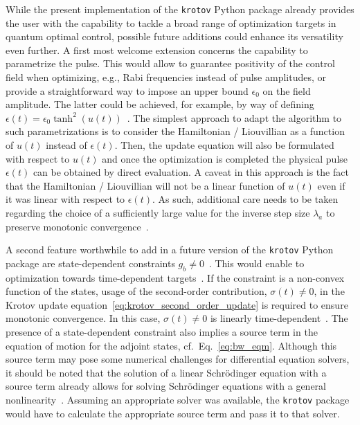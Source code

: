 \documentclass[submission, Phys]{SciPost}
\begin{document}
While the present implementation of the \texttt{krotov} Python package already
provides the user with the capability to tackle a broad range of optimization
targets in quantum optimal control, possible future additions could enhance its
versatility even further.
A first most welcome extension concerns the capability to parametrize the pulse.
This would allow to guarantee positivity of the control field when optimizing,
e.g., Rabi frequencies instead of pulse amplitudes, or provide a straightforward
way to impose an upper bound $\epsilon_0$ on the field amplitude.
The latter could be achieved, for example, by way of defining
$\epsilon(t)=\epsilon_0 \tanh^2\left(u(t)\right)$~\cite{MuellerPRA2011}.
The simplest approach to adapt the algorithm to such parametrizations is to
consider the Hamiltonian / Liouvillian as a function of $u(t)$ instead of
$\epsilon(t)$.
Then, the update equation will also be formulated with respect to $u(t)$ and
once the optimization is completed the physical pulse $\epsilon(t)$ can be
obtained by direct evaluation.
A caveat in this approach is the fact that the Hamiltonian / Liouvillian will
not be a linear function of $u(t)$ even if it was linear with respect to
$\epsilon(t)$.
As such, additional care needs to be taken regarding the choice of a
sufficiently large value for the inverse step size $\lambda_a$ to preserve
monotonic convergence~\cite{ReichJCP12}.

A second feature worthwhile to add in a future version of the \texttt{krotov}
Python package are state-dependent constraints
$g_b\neq0$~\cite{ReichJCP12,PalaoPRA2008}.
This would enable to optimization towards time-dependent
targets~\cite{KaiserJCP2004, SerbanPRA2005}.
If the constraint is a non-convex function of the states, usage of the
second-order contribution, $\sigma(t)\neq 0$, in the Krotov update
equation~\eqref{eq:krotov_second_order_update} is required to ensure monotonic
convergence.
In this case, $\sigma(t)\neq 0$ is linearly time-dependent~\cite{ReichJCP12}.
The presence of a state-dependent constraint also implies a source term in the
equation of motion for the adjoint states, cf.~Eq.~\eqref{eq:bw_eqm}.
Although this source term may pose some numerical challenges for differential
equation solvers, it should be noted that the solution of a linear Schrödinger
equation with a source term already allows for solving Schrödinger equations
with a general nonlinearity~\cite{SchaeferJCompP2017}.
Assuming an appropriate solver was available, the \texttt{krotov} package would
have to calculate the appropriate source term and pass it to that solver.
\end{document}
